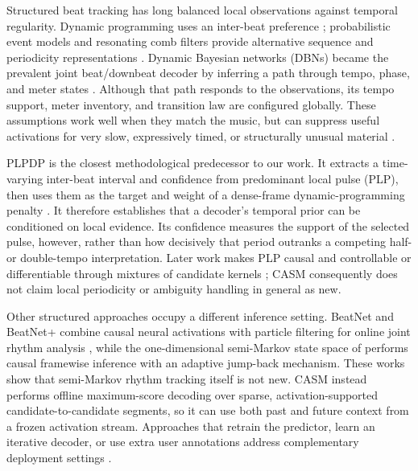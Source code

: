 \documentclass{article}
\begin{document}
Structured beat tracking has long balanced local observations against temporal
regularity. Dynamic programming uses an inter-beat preference
\cite{ellis2007beattracking}; probabilistic event models and resonating comb
filters provide alternative sequence and periodicity representations
\cite{korzeniowski2014crf,bock2015combfilter}. Dynamic Bayesian networks (DBNs)
became the prevalent joint beat/downbeat decoder by inferring a path through
tempo, phase, and meter states \cite{krebs2015dbn,bock2016joint}. Although that
path responds to the observations, its tempo support, meter inventory, and
transition law are configured globally. These assumptions work well when they
match the music, but can suppress useful activations for very slow,
expressively timed, or structurally unusual material
\cite{foscarin2024beat,ahn2026smcblindspot}.

PLPDP is the closest methodological predecessor to our work. It extracts a
time-varying inter-beat interval and confidence from predominant local pulse
(PLP), then uses them as the target and weight of a dense-frame dynamic-programming
penalty \cite{chiu2023localperiodicity}. It therefore establishes that a decoder's
temporal prior can be conditioned on local evidence. Its confidence measures the
support of the selected pulse, however, rather than how decisively that period
outranks a competing half- or double-tempo interpretation. Later work makes PLP
causal and controllable or differentiable through mixtures of candidate kernels
\cite{meier2024realtime,chiu2025dplp}; CASM consequently does not claim local
periodicity or ambiguity handling in general as new.

Other structured approaches occupy a different inference setting. BeatNet and
BeatNet+ combine causal neural activations with particle filtering for online
joint rhythm analysis \cite{heydari2021beatnet,heydari2024beatnetplus}, while the
one-dimensional semi-Markov state space of \cite{heydari2022semimarkov} performs
causal framewise inference with an adaptive jump-back mechanism. These works
show that semi-Markov rhythm tracking itself is not new. CASM instead performs
offline maximum-score decoding over sparse, activation-supported
candidate-to-candidate segments, so it can use both past and future context from
a frozen activation stream. Approaches that retrain the predictor, learn an
iterative decoder, or use extra user annotations address complementary deployment
settings \cite{chen2022postprocessingfree,foscarin2024beat,foscarin2026masked,
pinto2021userdriven}.
\end{document}
